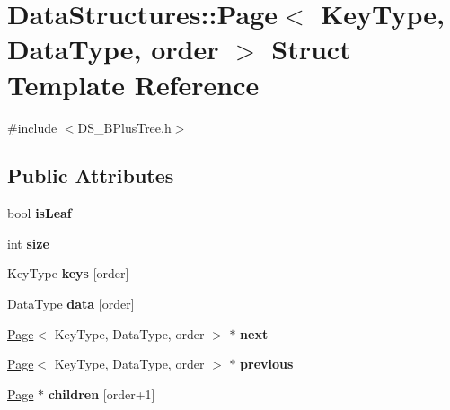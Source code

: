 \hypertarget{struct_data_structures_1_1_page}{\section{Data\-Structures\-:\-:Page$<$ Key\-Type, Data\-Type, order $>$ Struct Template Reference}
\label{struct_data_structures_1_1_page}
}


{\ttfamily \#include $<$D\-S\-\_\-\-B\-Plus\-Tree.\-h$>$}

\subsection*{Public Attributes}
\begin{DoxyCompactItemize}
\item 
\hypertarget{struct_data_structures_1_1_page_a9b2b5cb1fdd5ef355032162e6da67fb8}{bool {\bfseries is\-Leaf}}\label{struct_data_structures_1_1_page_a9b2b5cb1fdd5ef355032162e6da67fb8}

\item 
\hypertarget{struct_data_structures_1_1_page_a4440cd3ce0db1898fe3511b6e675e04c}{int {\bfseries size}}\label{struct_data_structures_1_1_page_a4440cd3ce0db1898fe3511b6e675e04c}

\item 
\hypertarget{struct_data_structures_1_1_page_a2e61c5f5aaa2f2093e9ea66ba91ab0f4}{Key\-Type {\bfseries keys} \mbox{[}order\mbox{]}}\label{struct_data_structures_1_1_page_a2e61c5f5aaa2f2093e9ea66ba91ab0f4}

\item 
\hypertarget{struct_data_structures_1_1_page_a75e91d62d50b35588a4ec213b455ad73}{Data\-Type {\bfseries data} \mbox{[}order\mbox{]}}\label{struct_data_structures_1_1_page_a75e91d62d50b35588a4ec213b455ad73}

\item 
\hypertarget{struct_data_structures_1_1_page_af356c65ea5891e42e1eacd3e79eae304}{\hyperlink{struct_data_structures_1_1_page}{Page}$<$ Key\-Type, Data\-Type, order $>$ $\ast$ {\bfseries next}}\label{struct_data_structures_1_1_page_af356c65ea5891e42e1eacd3e79eae304}

\item 
\hypertarget{struct_data_structures_1_1_page_a89e79b7e9bae6c2320349677f460250d}{\hyperlink{struct_data_structures_1_1_page}{Page}$<$ Key\-Type, Data\-Type, order $>$ $\ast$ {\bfseries previous}}\label{struct_data_structures_1_1_page_a89e79b7e9bae6c2320349677f460250d}

\item 
\hypertarget{struct_data_structures_1_1_page_a2c786de0cb834c236c6b47923f1c6010}{\hyperlink{struct_data_structures_1_1_page}{Page} $\ast$ {\bfseries children} \mbox{[}order+1\mbox{]}}\label{struct_data_structures_1_1_page_a2c786de0cb834c236c6b47923f1c6010}

\end{DoxyCompactItemize}



